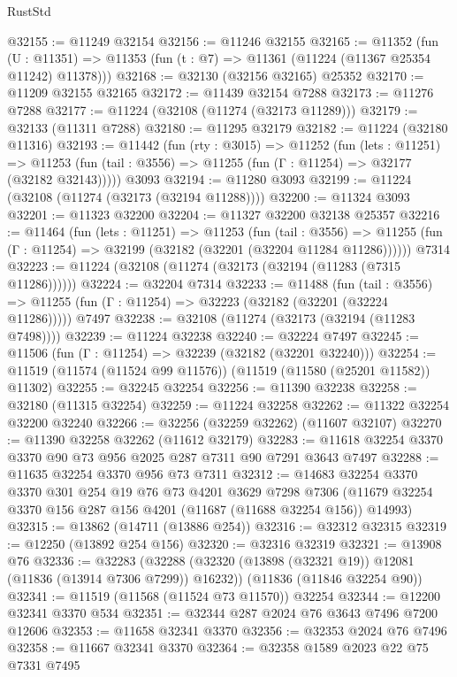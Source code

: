 \begin{lexlean}{RustStd}
\begin{coremodule}
@32155 := @11249 @32154
@32156 := @11246 @32155
@32165 := @11352
    (fun (U : @11351) => @11353 (fun (t : @7) => @11361 (@11224 (@11367 @25354 @11242) @11378)))
@32168 := @32130 (@32156 @32165) @25352
@32170 := @11209 @32155 @32165
@32172 := @11439 @32154 @7288
@32173 := @11276 @7288
@32177 := @11224 (@32108 (@11274 (@32173 @11289)))
@32179 := @32133 (@11311 @7288)
@32180 := @11295 @32179
@32182 := @11224 (@32180 @11316)
@32193 := @11442
    (fun (rty : @3015) =>
    @11252
      (fun (lets : @11251) =>
      @11253 (fun (tail : @3556) => @11255 (fun (Γ : @11254) => @32177 (@32182 @32143)))))
    @3093
@32194 := @11280 @3093
@32199 := @11224 (@32108 (@11274 (@32173 (@32194 @11288))))
@32200 := @11324 @3093
@32201 := @11323 @32200
@32204 := @11327 @32200 @32138 @25357
@32216 := @11464
    (fun (lets : @11251) =>
    @11253
      (fun (tail : @3556) =>
      @11255 (fun (Γ : @11254) => @32199 (@32182 (@32201 (@32204 @11284 @11286))))))
    @7314
@32223 := @11224 (@32108 (@11274 (@32173 (@32194 (@11283 (@7315 @11286))))))
@32224 := @32204 @7314
@32233 := @11488
    (fun (tail : @3556) => @11255 (fun (Γ : @11254) => @32223 (@32182 (@32201 (@32224 @11286)))))
    @7497
@32238 := @32108 (@11274 (@32173 (@32194 (@11283 @7498))))
@32239 := @11224 @32238
@32240 := @32224 @7497
@32245 := @11506 (fun (Γ : @11254) => @32239 (@32182 (@32201 @32240)))
@32254 := @11519 (@11574 (@11524 @99 @11576)) (@11519 (@11580 (@25201 @11582)) @11302)
@32255 := @32245 @32254
@32256 := @11390 @32238
@32258 := @32180 (@11315 @32254)
@32259 := @11224 @32258
@32262 := @11322 @32254 @32200 @32240
@32266 := @32256 (@32259 @32262) (@11607 @32107)
@32270 := @11390 @32258 @32262 (@11612 @32179)
@32283 := @11618 @32254 @3370 @3370 @90 @73 @956 @2025 @287 @7311 @90 @7291 @3643 @7497
@32288 := @11635 @32254 @3370 @956 @73 @7311
@32312 := @14683
    @32254
    @3370
    @3370
    @301
    @254
    @19
    @76
    @73
    @4201
    @3629
    @7298
    @7306
    (@11679 @32254 @3370 @156 @287 @156 @4201 (@11687 (@11688 @32254 @156)) @14993)
@32315 := @13862 (@14711 (@13886 @254))
@32316 := @32312 @32315
@32319 := @12250 (@13892 @254 @156)
@32320 := @32316 @32319
@32321 := @13908 @76
@32336 := @32283
    (@32288 (@32320 (@13898 (@32321 @19)) @12081 (@11836 (@13914 @7306 @7299)) @16232))
    (@11836 (@11846 @32254 @90))
@32341 := @11519 (@11568 (@11524 @73 @11570)) @32254
@32344 := @12200 @32341 @3370 @534
@32351 := @32344 @287 @2024 @76 @3643 @7496 @7200 @12606
@32353 := @11658 @32341 @3370
@32356 := @32353 @2024 @76 @7496
@32358 := @11667 @32341 @3370
@32364 := @32358 @1589 @2023 @22 @75 @7331 @7495

\end{coremodule}
\end{lexlean}
